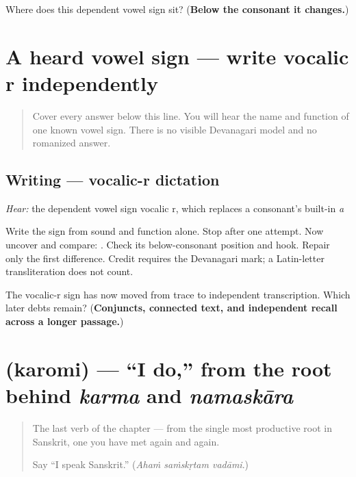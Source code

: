 \begin{tcolorbox}[breakable,colback=teal!4,colframe=teal!35!black,title={Before you move on}]
Where does this dependent vowel sign sit? (\textbf{Below the consonant it changes.})
\end{tcolorbox}
\section[\texorpdfstring{\sk{ृ} (ṛ)}{ृ (ṛ)}]{A heard vowel sign — write vocalic r independently}

\label{lesson:SA-W05-vocalic-r-dictation}



\begin{quote}
Cover every answer below this line. You will hear the name and function of one known vowel sign. There is no visible Devanagari model and no romanized answer.
\end{quote}

\subsection*{Writing — vocalic-r dictation}
\emph{Hear:} the dependent vowel sign vocalic r, which replaces a consonant's built-in \emph{a}

Write the sign from sound and function alone. Stop after one attempt. Now uncover and compare: \textbf{}. Check its below-consonant position and hook. Repair only the first difference. Credit requires the Devanagari mark; a Latin-letter transliteration does not count.

\begin{tcolorbox}[breakable,colback=teal!4,colframe=teal!35!black,title={Before you move on}]
The vocalic-r sign has now moved from trace to independent transcription. Which later debts remain? (\textbf{Conjuncts, connected text, and independent recall across a longer passage.})
\end{tcolorbox}
\section[\texorpdfstring{\sk{करोमि} (karomi)}{करोमि (karomi)}]{ (karomi) — \textquotedblleft{}I do,\textquotedblright{} from the root behind \emph{karma} and \emph{namaskāra}}

\label{lesson:SA-C05-karomi}



\begin{quote}
The last verb of the chapter — from the single most productive root in Sanskrit, one you have met again and again.

Say \textquotedblleft{}I speak Sanskrit.\textquotedblright{} (\emph{Ahaṁ saṁskṛtam vadāmi}.)
\end{quote}

